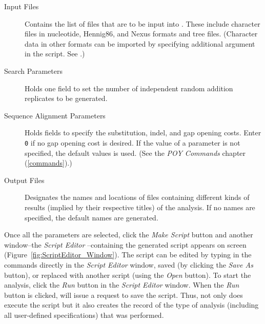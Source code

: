 \begin{description}
    \item[Input Files]
        Contains the list of files that are to be input into \poy. These include
        character files in nucleotide, Hennig86, and Nexus formats and tree files. (Character data in other formats can be imported by specifying additional argument in the script. See .)
    \item[Search Parameters]
        Holds one field to set the number of independent random addition replicates to be generated.
    \item[Sequence Alignment Parameters]
        Holds fields to specify the substitution, indel, and gap opening costs. Enter \texttt{0} if no
        gap opening cost is desired. If the value of a parameter is not specified, the default values is used. (See the \emph{POY Commands} chapter (\ref{commands}).)
    \item[Output Files]
        Designates the names and locations of files containing different kinds of results
        (implied by their respective titles) of the analysis. If no names are specified, the default names are generated.
\end{description}

Once all the parameters are selected, click the \emph{Make Script} button and another
window--the \emph{Script Editor} --containing the generated script appears on screen (Figure~\ref{fig:ScriptEditor_Window}). The
script can be edited by typing in the commands directly in the \emph{Script Editor} window,
 saved (by clicking the \emph{Save As} button), or replaced with another script (using 
 the \emph{Open} button). To start the analysis, click the \emph{Run} button in the 
 \emph{Script Editor} window. When the \emph{Run} button is clicked, \poy will issue a
 request to save the script. Thus, not only does \poy execute the script but
 it also creates the record of the type of analysis (including all user-defined specifications) that was performed.
 
